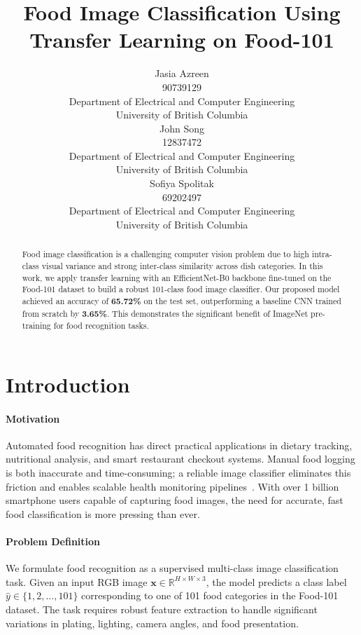 \documentclass{article}
\title{Food Image Classification Using Transfer Learning on Food-101}
\author{%
  Jasia Azreen \\
  90739129 \\
  Department of Electrical and Computer Engineering \\
  University of British Columbia \\
  \And
  John Song \\
  12837472 \\
  Department of Electrical and Computer Engineering \\
  University of British Columbia \\
  \And
  Sofiya Spolitak \\
  69202497 \\
  Department of Electrical and Computer Engineering \\
  University of British Columbia \\
}
\begin{document}
\maketitle

\begin{abstract}
Food image classification is a challenging computer vision problem due to high
intra-class visual variance and strong inter-class similarity across dish
categories. In this work, we apply transfer learning with an EfficientNet-B0
backbone fine-tuned on the Food-101 dataset to build a robust 101-class food
image classifier. Our proposed model achieved an accuracy of \textbf{65.72\%} on
the test set, outperforming a baseline CNN trained from scratch by \textbf{3.65\%}.
This demonstrates the significant benefit of ImageNet pre-training for food recognition tasks.
\end{abstract}

\section{Introduction}

\paragraph{Motivation}
Automated food recognition has direct practical applications in dietary tracking,
nutritional analysis, and smart restaurant checkout systems. Manual food logging
is both inaccurate and time-consuming; a reliable image classifier eliminates
this friction and enables scalable health monitoring pipelines~\citep{bossard2014food101}.
With over 1 billion smartphone users capable of capturing food images, the need
for accurate, fast food classification is more pressing than ever.

\paragraph{Problem Definition}
We formulate food recognition as a supervised multi-class image classification
task. Given an input RGB image $\mathbf{x} \in \mathbb{R}^{H \times W \times 3}$,
the model predicts a class label $\hat{y} \in \{1, 2, \ldots, 101\}$
corresponding to one of 101 food categories in the Food-101 dataset. The task
requires robust feature extraction to handle significant variations in plating,
lighting, camera angles, and food presentation.
\end{document}
